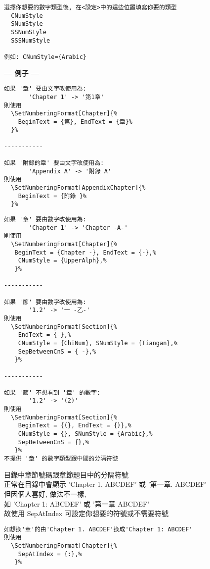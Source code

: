 \begin{enumerate}
{\begin{DescriptionFrame}
\begin{verbatim}
選擇你想要的數字類型後, 在<設定>中的這些位置填寫你要的類型
  CNumStyle
  SNumStyle
  SSNumStyle
  SSSNumStyle

例如: CNumStyle={Arabic}
    \end{verbatim}
    \end{DescriptionFrame}

    \textbf{--- 例子 ---}
    \begin{DescriptionFrame}
    \begin{verbatim}
如果 '章' 要由文字改使用為:
       'Chapter 1' -> '第1章'
則使用
  \SetNumberingFormat[Chapter]{%
    BeginText = {第}, EndText = {章}%
  }%

-----------

如果 '附錄的章' 要由文字改使用為:
       'Appendix A' -> '附錄 A'
則使用
  \SetNumberingFormat[AppendixChapter]{%
    BeginText = {附錄 }%
  }%
    \end{verbatim}
    \end{DescriptionFrame}

    \begin{DescriptionFrame}
    \begin{verbatim}
如果 '章' 要由數字改使用為:
       'Chapter 1' -> 'Chapter -A-'
則使用
  \SetNumberingFormat[Chapter]{%
   BeginText = {Chapter -}, EndText = {-},%
    CNumStyle = {UpperAlph},%
   }%

-----------

如果 '節' 要由數字改使用為:
       '1.2' -> '一 -乙-'
則使用
  \SetNumberingFormat[Section]{%
    EndText = {-},%
    CNumStyle = {ChiNum}, SNumStyle = {Tiangan},%
    SepBetweenCnS = { -},%
   }%

-----------

如果 '節' 不想看到 '章' 的數字:
       '1.2' -> '(2)'
則使用
  \SetNumberingFormat[Section]{%
    BeginText = {(}, EndText = {)},%
    CNumStyle = {}, SNumStyle = {Arabic},%
    SepBetweenCnS = {},%
   }%
不提供 '章' 的數字類型跟中間的分隔符號
    \end{verbatim}
    \end{DescriptionFrame}

\newpage
    目錄中章節號碼跟章節題目中的分隔符號\\
    正常在目錄中會顯示 'Chapter 1. ABCDEF' 或 '第一章. ABCDEF'\\
    但因個人喜好, 做法不一樣,\\
    如 'Chapter 1: ABCDEF' 或 '第一章 ABCDEF'\\
    故使用 SepAtIndex 可設定你想要的符號或不需要符號
    \begin{DescriptionFrame}
    \begin{verbatim}
如想換'章'的由'Chapter 1. ABCDEF'換成'Chapter 1: ABCDEF'
則使用
  \SetNumberingFormat[Chapter]{%
    SepAtIndex = {:},%
   }%


\end{verbatim}
\end{DescriptionFrame}}
\end{enumerate}
